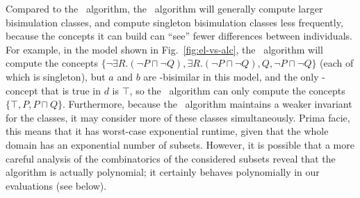 Compared to the \alc\ algorithm, the \el\ algorithm will generally
compute larger bisimulation classes, and compute singleton
bisimulation classes less frequently, because the concepts it can
build can ``see'' fewer differences between individuals.  For example,
in the model shown in Fig.~\ref{fig:el-vs-alc}, the \alc\ algorithm
will compute the concepts $\{\neg \exists R. (\neg P \sqcap \neg Q),
\exists R. (\neg P \sqcap \neg Q), Q, \neg P \sqcap \neg Q\}$ (each of
which is singleton), but $a$ and $b$ are \el-bisimilar in this model,
and the only \el-concept that is true in $d$ is $\top$, so the \el\
algorithm can only compute the concepts $\{\top, P, P \sqcap Q\}$.
Furthermore, because the \el\ algorithm maintains a weaker invariant
for the classes, it may consider more of these classes simultaneously.
Prima facie, this means that it has worst-case exponential runtime,
given that the whole domain has an exponential number of subsets.
However, it is possible that a more careful analysis of the
combinatorics of the considered subsets reveal that the algorithm is
actually polynomial; it certainly behaves polynomially in our
evaluations (see below).


